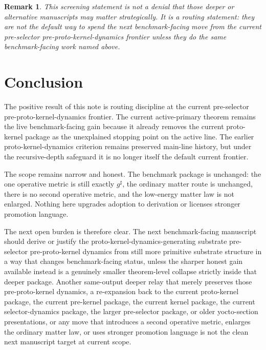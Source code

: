 \documentclass[11pt]{article}
\newcommand{\CompletedMetric}{g^{\sharp}}
\newtheorem{remark}{Remark}
\begin{document}
\begin{remark}
This screening statement is not a denial that those deeper or alternative manuscripts may matter strategically. It is a routing statement: they are not the default way to spend the next benchmark-facing move from the current pre-selector pre-proto-kernel-dynamics frontier unless they do the same benchmark-facing work named above.
\end{remark}

\section{Conclusion}

The positive result of this note is routing discipline at the current pre-selector pre-proto-kernel-dynamics frontier. The current active-primary theorem remains the live benchmark-facing gain because it already removes the current proto-kernel package as the unexplained stopping point on the active line. The earlier proto-kernel-dynamics criterion remains preserved main-line history, but under the recursive-depth safeguard it is no longer itself the default current frontier.

The scope remains narrow and honest. The benchmark package is unchanged: the one operative metric is still exactly \(\CompletedMetric\), the ordinary matter route is unchanged, there is no second operative metric, and the low-energy matter law is not enlarged. Nothing here upgrades adoption to derivation or licenses stronger promotion language.

The next open burden is therefore clear. The next benchmark-facing manuscript should derive or justify the proto-kernel-dynamics-generating substrate pre-selector pre-proto-kernel dynamics from still more primitive substrate structure in a way that changes benchmark-facing status, unless the sharper honest gain available instead is a genuinely smaller theorem-level collapse strictly inside that deeper package. Another same-output deeper relay that merely preserves those pre-proto-kernel dynamics, a re-expansion back to the current proto-kernel package, the current pre-kernel package, the current kernel package, the current selector-dynamics package, the larger pre-selector package, or older yocto-section presentations, or any move that introduces a second operative metric, enlarges the ordinary matter law, or uses stronger promotion language is not the clean next manuscript target at current scope.
\end{document}
